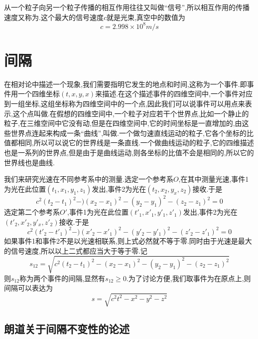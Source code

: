 从一个粒子向另一个粒子传播的相互作用往往又叫做``信号'',所以相互作用的传播速度又称为.这个最大的信号速度$c$就是光束,真空中的数值为
\begin{equation}
  c=2.998\times 10^8 m/s
  \label{eq:signalmax}
\end{equation}

\section{间隔}

在相对论中描述一个现象,我们需要指明它发生的地点和时间,这称为一个事件.即事件用一个四维坐标$(t,x,y,x)$来描述.在这个描述事件的四维空间中,一个事件对应到一组坐标,这组坐标称为四维空间中的一个点,因此我们可以说事件可以用点来表示,这个点叫做.在假想的四维空间中,一个粒子对应若干个世界点,比如一个静止的粒子,在三维空间中它没有动,但是在四维空间中,它的时间坐标是一直增加的,由这些世界点连起来构成一条``曲线'',叫做.一个做匀速直线运动的粒子,它各个坐标的比值都相同,所以可以说它的世界线是一条直线.一个做曲线运动的粒子,它的四维描述也是一系列的世界点,但是由于是曲线运动,则各坐标的比值不会是相同的,所以它的世界线也是曲线.

我们来研究光速在不同参考系中的测量.选定一个参考系$O$,在其中测量光速,事件1为光在此位置$(t_1,x_1,y_1,z_1)$发出,事件2为光在$(t_2,x_2,y_x,z_2)$接收.于是
\begin{equation}
c^2(t_2-t_1)^2-)(x_2-x_1)^2-(y_2-y_1)^2-(z_2-z_1)^2=0
  \label{eq:Olight0}
\end{equation}
选定第二个参考系$O'$,事件1为光在此位置$(t'_1,x'_1,y'_1,z'_1)$发出,事件2为光在$(t'_2,x'_2,y'_x,z'_2)$接收.于是
\begin{equation}
c^2(t'_2-t'_1)^2-)(x'_2-x'_1)^2-(y'_2-y'_1)^2-(z'_2-z'_1)^2=0
  \label{eq:Olight1}
\end{equation}
如果事件1和事件2不是以光速相联系,则上式必然就不等于零.同时由于光速是最大的信号速度,所以以上二式都应当大于等于零.记
\begin{equation}
  s_{12}=\sqrt{c^2(t_2-t_1)^2-(x_2-x_1)^2-(y_2-y_1)^2-(z_2-z_1)^2}
  \label{eq:jiange0}
\end{equation}
则$s_{12}$称为两个事件的间隔,显然有$s_{12}\geqslant 0$.为了讨论方便,我们取事件为在原点上,则间隔可以表达为
\begin{equation}
  s=\sqrt{c^2t^2-x^2-y^2-z^2}
  \label{eq:jiange}
\end{equation}

\subsection{朗道关于间隔不变性的论述}

